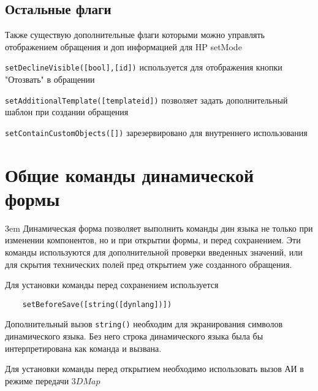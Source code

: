 \documentclass[../index.tex]{subfiles}
\begin{document}
\subsection{Остальные флаги}
Также существую дополнительные флаги которыми можно управлять отображением обращения и доп информацией для HP setMode

\verb|setDeclineVisible([bool],[id])| используется для отображения кнопки "Отозвать" в обращении

\verb|setAdditionalTemplate([templateid])| позволяет задать дополнительный шаблон при создании обращения

\verb|setContainCustomObjects([])| зарезервировано для внутреннего использования

\section{Общие команды динамической формы}
\emergencystretch 3em
Динамическая форма позволяет выполнить команды дин языка не только при изменении компонентов, но и при открытии формы,
и перед сохранением. Эти команды используются для дополнительной проверки введенных значений, или для скрытия 
технических полей пред открытием уже созданного обращения.

Для установки команды перед сохранением используется
\begin{verbatim}
    setBeforeSave([string([dynlang])])
\end{verbatim}
Дополнительный вызов \verb|string()| необходим для экранирования символов динамического языка. Без него строка динамического языка
была бы интерпретирована как команда и вызвана.

Для установки команды перед открытием необходимо использовать вызов АИ в режиме передачи $3DMap$
\end{document}
